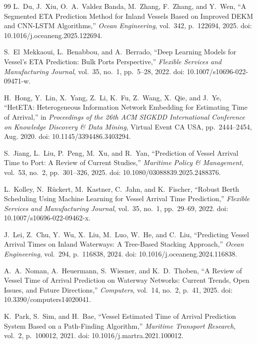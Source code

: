 \documentclass[conference]{IEEEtran}
\begin{document}
\begin{thebibliography}{99}
L.~Du, J.~Xiu, O.~A.~Valdez Banda, M.~Zhang, F.~Zhang, and Y.~Wen, ``A Segmented ETA Prediction Method for Inland Vessels Based on Improved DEKM and CNN-LSTM Algorithms,'' \textit{Ocean Engineering}, vol.~342, p.~122694, 2025. doi: 10.1016/j.oceaneng.2025.122694.

S.~El~Mekkaoui, L.~Benabbou, and A.~Berrado, ``Deep Learning Models for Vessel's ETA Prediction: Bulk Ports Perspective,'' \textit{Flexible Services and Manufacturing Journal}, vol.~35, no.~1, pp.~5--28, 2022. doi: 10.1007/s10696-022-09471-w.

H.~Hong, Y.~Lin, X.~Yang, Z.~Li, K.~Fu, Z.~Wang, X.~Qie, and J.~Ye, ``HetETA: Heterogeneous Information Network Embedding for Estimating Time of Arrival,'' in \textit{Proceedings of the 26th ACM SIGKDD International Conference on Knowledge Discovery \& Data Mining}, Virtual Event CA USA, pp.~2444--2454, Aug. 2020. doi: 10.1145/3394486.3403294.

S.~Jiang, L.~Liu, P.~Peng, M.~Xu, and R.~Yan, ``Prediction of Vessel Arrival Time to Port: A Review of Current Studies,'' \textit{Maritime Policy \& Management}, vol.~53, no.~2, pp.~301--326, 2025. doi: 10.1080/03088839.2025.2488376.

L.~Kolley, N.~R{\"u}ckert, M.~Kastner, C.~Jahn, and K.~Fischer, ``Robust Berth Scheduling Using Machine Learning for Vessel Arrival Time Prediction,'' \textit{Flexible Services and Manufacturing Journal}, vol.~35, no.~1, pp.~29--69, 2022. doi: 10.1007/s10696-022-09462-x.

J.~Lei, Z.~Chu, Y.~Wu, X.~Liu, M.~Luo, W.~He, and C.~Liu, ``Predicting Vessel Arrival Times on Inland Waterways: A Tree-Based Stacking Approach,'' \textit{Ocean Engineering}, vol.~294, p.~116838, 2024. doi: 10.1016/j.oceaneng.2024.116838.

A.~A.~Noman, A.~Heuermann, S.~Wiesner, and K.~D.~Thoben, ``A Review of Vessel Time of Arrival Prediction on Waterway Networks: Current Trends, Open Issues, and Future Directions,'' \textit{Computers}, vol.~14, no.~2, p.~41, 2025. doi: 10.3390/computers14020041.

K.~Park, S.~Sim, and H.~Bae, ``Vessel Estimated Time of Arrival Prediction System Based on a Path-Finding Algorithm,'' \textit{Maritime Transport Research}, vol.~2, p.~100012, 2021. doi: 10.1016/j.martra.2021.100012.


\end{thebibliography}
\end{document}
